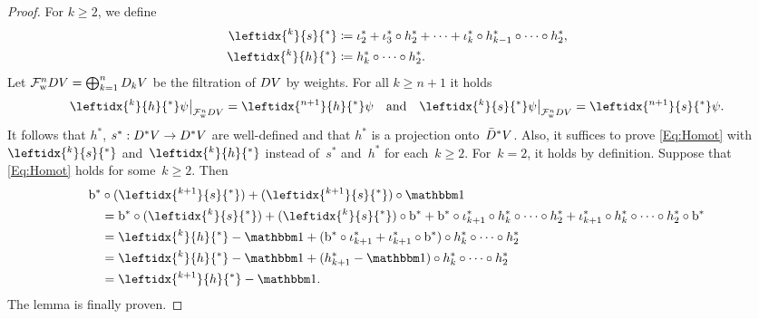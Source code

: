 \documentclass[\MainFolder/Text.tex]{subfiles}
\begin{document}
\begin{proof}
For $k\ge 2$, we define
\begin{align*}
 \leftidx{^k}{s}{^*} &\coloneqq \InsOneOp_2^* +  \InsOneOp_3^* \circ h_2^* + \dotsb + \InsOneOp_k^* \circ h_{k-1}^* \circ \dotsb \circ h_2^*, \\
 \leftidx{^k}{h}{^*} &\coloneqq h_k^* \circ \dotsb \circ h_2^*.
\end{align*}
Let $\mathcal{F}^n_{\mathrm{w}} D V = \bigoplus_{k=1}^n D_k V$ be the filtration of $D V$ by weights. For all $k\ge n+1$ it holds
\[ \Restr{\leftidx{^{k}}{h}{^*}\psi}{\Filtr^n_{\WeightMRM} \HC V} = \leftidx{^{n+1}}{h}{^*}\psi\quad\text{and}\quad \Restr{\leftidx{^k}{s}{^*}\psi}{\Filtr^n_{\WeightMRM} \HC V} = \leftidx{^{n+1}}{s}{^*}\psi. \]
It follows that $h^*$, $s^*: D^* V \rightarrow D^* V$ are well-defined and that $h^*$ is a projection onto~$\bar{D}^* V$. Also, it suffices to prove  \eqref{Eq:Homot} with~$\leftidx{^k}{s}{^*}$ and~$\leftidx{^k}{h}{^*}$ instead of~$s^*$ and~$h^*$ for each~$k\ge 2$. For~$k=2$, it holds by definition. Suppose that \eqref{Eq:Homot} holds for some~$k\ge 2$. Then
\begin{align*}
&\Hd^*\circ (\leftidx{^{k+1}}{s}{^*}) + (\leftidx{^{k+1}}{s}{^*})\circ \Id \\
&\quad = \Hd^*\circ (\leftidx{^{k}}{s}{^*}) + (\leftidx{^{k}}{s}{^*}) \circ \Hd^* + \Hd^*\circ \InsOneOp_{k+1}^*\circ h_k^*\circ \dotsb \circ h_2^* + \InsOneOp_{k+1}^*\circ h_k^*  \circ \dotsb \circ h_2^* \circ \Hd^* \\
&\quad = \leftidx{^k}{h}{^*}- \Id + (\Hd^*\circ \InsOneOp_{k+1}^* + \InsOneOp_{k+1}^*\circ \Hd^*)\circ h_k^* \circ \dotsb \circ h_2^*  \\
&\quad = \leftidx{^k}{h}{^*}- \Id + (h_{k+1}^* - \Id)\circ h_k^* \circ \dotsb \circ h_2^* \\
&\quad = \leftidx{^{k+1}}{h}{^*} - \Id.
\end{align*}
The lemma is finally proven.\qedhere
\end{proof}
%
\end{document}
